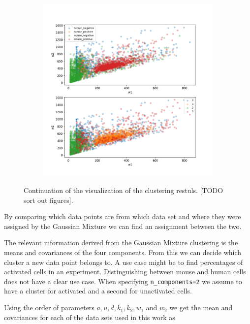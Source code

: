 \begin{figure}
\begin{subfigure}{0.45\textwidth}
	\end{subfigure}
	\hfill
	\begin{subfigure}{0.45\textwidth}
		\includegraphics[width=\textwidth]{fig/seperate_w1_w2}
	\end{subfigure}
	
	\caption{Continuation of the visualization of the clustering restuls. [TODO sort out figures].}
	\label{fig:vis_output_seperate4}
\end{figure}

By comparing which data points are from which data set and where they were assigned by the Gaussian Mixture we can find an assignment between the two.

\newpage

The relevant information derived from the Gaussian Mixture clustering is the means and covariances of the four components. From this we can decide which cluster a new data point belongs to. A use case might be to find percentages of activated cells in an experiment. Distinguishing between mouse and human cells does not have a clear use case. When specifying \texttt{n\_components=2} we assume to have a cluster for activated and a second for unactivated cells.

Using the order of parameters $a, u, d, k_1, k_2, w_1$ and $w_2$ we get the mean and covariances for each of the data sets used in this work as 

